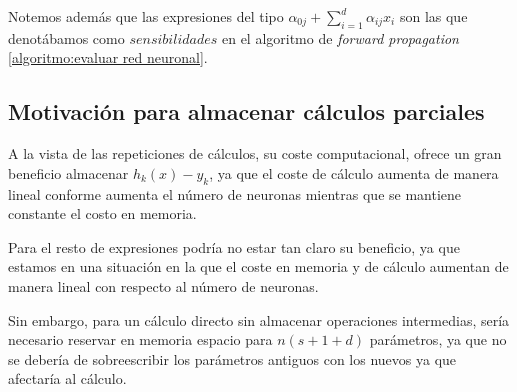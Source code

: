 \begin{table}[H]
    \begin{center}
    \caption{Veces que se calcula una misma expresión 
    para el cálculo de gradiente descendente fijado un
     $i$ y coste en memoria en unidades si se almacenara el cálculo de todos esos parámetros.}
    \label{tab:expresiones_repetidas_en_descenso_gradiente}
    \end{center}
\end{table}

Notemos además que las expresiones del tipo 
$\alpha_{0 j} + \sum_{i=1}^d \alpha_{i j}x_i$  son las que denotábamos como $sensibilidades$ en el algoritmo de \textit{forward propagation} \ref{algoritmo:evaluar red neuronal}.
 

\subsection{ Motivación para almacenar cálculos parciales}  

A la vista de las repeticiones de cálculos, su coste computacional,
 ofrece un gran beneficio almacenar $h_k(x)-y_k$, ya que el coste de cálculo aumenta de manera lineal conforme aumenta el número de neuronas mientras que se mantiene constante el costo en memoria.      

Para el resto de expresiones podría no estar tan claro su beneficio, 
ya que estamos en una situación en la que el coste en memoria y de cálculo aumentan de manera lineal con respecto al número de neuronas. 

Sin embargo, para un cálculo directo sin almacenar operaciones intermedias, sería necesario reservar en memoria espacio para $n (s + 1 + d )$  parámetros, ya que no se debería de sobreescribir los parámetros antiguos con los nuevos ya que afectaría al cálculo. 

